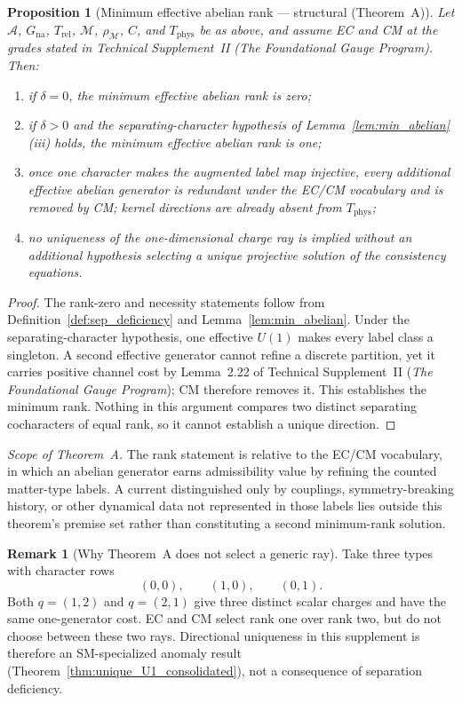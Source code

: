 \documentclass[11pt]{article}
\newtheorem{proposition}[theorem]{Proposition}
\theoremstyle{definition}
\newtheorem{remark}[theorem]{Remark}
\newcommand{\TSII}{Technical Supplement~II (\emph{The Foundational Gauge Program})}
\begin{document}
\begin{proposition}[Minimum effective abelian rank --- structural
(Theorem~A)]\label{prop:unique_U1}
Let $\mathcal A$, $G_{\mathrm{na}}$, $T_{\mathrm{rel}}$,
$\mathcal M$, $\rho_{\mathcal M}$, $C$, and $T_{\mathrm{phys}}$ be as
above, and assume EC and CM at the grades stated in \TSII{}.
Then:
\begin{enumerate}[label=(\roman*),nosep]
  \item if $\delta=0$, the minimum effective abelian rank is zero;
  \item if $\delta>0$ and the separating-character hypothesis of
  Lemma~\ref{lem:min_abelian}(iii) holds, the minimum effective
  abelian rank is one;
  \item once one character makes the augmented label map injective,
  every additional effective abelian generator is redundant under the
  EC/CM vocabulary and is removed by CM; kernel directions are already
  absent from $T_{\mathrm{phys}}$;
  \item no uniqueness of the one-dimensional charge ray is implied
  without an additional hypothesis selecting a unique projective
  solution of the consistency equations.
\end{enumerate}
\end{proposition}

\begin{proof}
The rank-zero and necessity statements follow from
Definition~\ref{def:sep_deficiency} and
Lemma~\ref{lem:min_abelian}.  Under the separating-character
hypothesis, one effective $U(1)$ makes every label class a singleton.
A second effective generator cannot refine a discrete partition, yet
it carries positive channel cost by Lemma~2.22 of \TSII{}; CM therefore
removes it.  This establishes the minimum rank.  Nothing in this
argument compares two distinct separating cocharacters of equal rank,
so it cannot establish a unique direction.
\end{proof}

\noindent\emph{Scope of Theorem~A.}\quad
The rank statement is relative to the EC/CM vocabulary, in which an
abelian generator earns admissibility value by refining the counted
matter-type labels.  A current distinguished only by couplings,
symmetry-breaking history, or other dynamical data not represented in
those labels lies outside this theorem's premise set rather than
constituting a second minimum-rank solution.

\begin{remark}[Why Theorem~A does not select a generic ray]
Take three types with character rows
\[
  (0,0),\qquad(1,0),\qquad(0,1).
\]
Both $q=(1,2)$ and $q=(2,1)$ give three distinct scalar charges and
have the same one-generator cost.  EC and CM select rank one over rank
two, but do not choose between these two rays.  Directional uniqueness
in this supplement is therefore an SM-specialized anomaly result
(Theorem~\ref{thm:unique_U1_consolidated}), not a consequence of
separation deficiency.
\end{remark}
\end{document}
